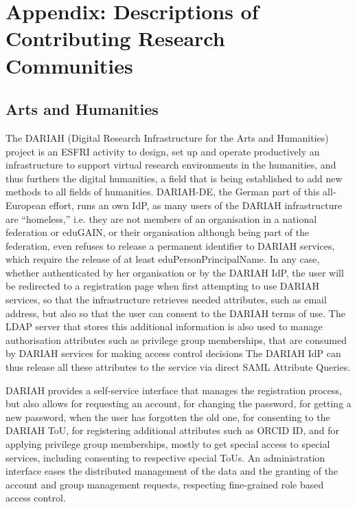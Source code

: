 \documentclass[fleqn,11pt]{wlscirep}
\begin{document}
{\appendix
\newpage



\newpage
\section{Appendix: Descriptions of Contributing Research Communities}

\subsection{Arts and Humanities}
The DARIAH (Digital Research Infrastructure for the Arts and Humanities)\cite{dariah} project is an ESFRI activity to design, set up and operate productively an infrastructure to support virtual research environments in the humanities, and thus furthers the digital humanities, a field that is being established to add new methods to all fields of humanities. DARIAH-DE, the German part of this all-European effort, runs an own IdP, as many users of the DARIAH infrastructure are “homeless,” i.e. they are not members of an organisation in a national federation or eduGAIN, or their organisation although being part of the federation, even refuses to release a permanent identifier to DARIAH services, which require the release of at least eduPersonPrincipalName. In any case, whether authenticated by her organisation or by the DARIAH IdP, the user will be redirected to a registration page when first attempting to use DARIAH services, so that the infrastructure retrieves needed attributes, such as email address, but also so that the user can consent to the DARIAH terms of use. The LDAP server that stores this additional information is also used to manage authorisation attributes such as privilege group memberships, that are consumed by DARIAH services for making access control decisions The DARIAH IdP can thus release all these attributes to the service via direct SAML Attribute Queries.

DARIAH provides a self-service interface that manages the registration process, but also allows for requesting an account, for changing the password, for getting a new password, when the user has forgotten the old one, for consenting to the DARIAH ToU, for registering additional attributes such as ORCID ID, and for applying privilege group memberships, mostly to get special access to special services, including consenting to respective special ToUs. An administration interface eases the distributed management of the data and the granting of the account and group management requests, respecting fine-grained role based access control.

}
\end{document}
